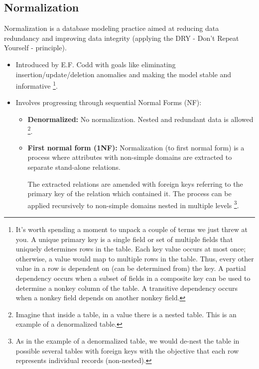 \subsection*{Normalization}
Normalization is a database modeling practice aimed at reducing
data redundancy and improving data integrity (applying the DRY
- Don't Repeat Yourself - principle).
\begin{itemize}
    \item Introduced by E.F. Codd with goals like eliminating
    insertion/update/deletion anomalies and making the model
    stable and informative
    \footnote{
        It's worth spending a moment to unpack a couple of terms we just threw at you. A
        unique primary key is a single field or set of multiple fields that uniquely determines
        rows in the table. Each key value occurs at most once; otherwise, a value would map
        to multiple rows in the table. Thus, every other value in a row is dependent on (can
        be determined from) the key. A partial dependency occurs when a subset of fields in
        a composite key can be used to determine a nonkey column of the table. A transitive
        dependency occurs when a nonkey field depends on another nonkey field.
    }.

    \item Involves progressing through sequential Normal Forms (NF):
    \begin{itemize}
        \item \textbf{Denormalized:} No normalization. Nested and
        redundant data is allowed
        \footnote{
            Imagine that inside a table, in a value there is a nested 
            table. This is an example of a denormalized table.
        }.

        \item \textbf{First normal form (1NF):} Normalization
        (to first normal form) is a process where attributes with
        non-simple domains are extracted to separate stand-alone
        relations.

        The extracted relations are amended with foreign keys
        referring to the primary key of the relation which contained
        it. The process can be applied recursively to non-simple
        domains nested in multiple levels
        \footnote{
            As in the example of a denormalized table, we would
            de-nest the table in possible several tables with
            foreign keys with the objective that each row
            represents individual records (non-nested).
        }.
        

\end{itemize}
\end{itemize}
